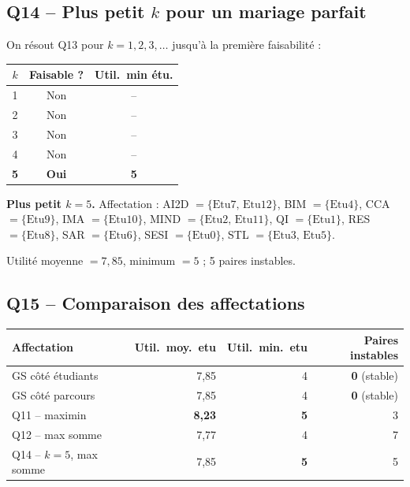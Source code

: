 \documentclass[11pt,a4paper]{article}
\begin{document}
\subsection*{Q14 -- Plus petit $k$ pour un mariage parfait}

On résout Q13 pour $k = 1, 2, 3, \ldots$ jusqu'à la première faisabilité :

\begin{center}
\begin{tabular}{ccc}
\toprule
$k$ & \textbf{Faisable ?} & \textbf{Util.\ min étu.} \\
\midrule
1 & Non & -- \\
2 & Non & -- \\
3 & Non & -- \\
4 & Non & -- \\
\textbf{5} & \textbf{Oui} & \textbf{5} \\
\bottomrule
\end{tabular}
\end{center}

\textbf{Plus petit $k = 5$.} Affectation : AI2D $= \{\text{Etu7, Etu12}\}$, BIM $= \{\text{Etu4}\}$, CCA $= \{\text{Etu9}\}$, IMA $= \{\text{Etu10}\}$, MIND $= \{\text{Etu2, Etu11}\}$, QI $= \{\text{Etu1}\}$, RES $= \{\text{Etu8}\}$, SAR $= \{\text{Etu6}\}$, SESI $= \{\text{Etu0}\}$, STL $= \{\text{Etu3, Etu5}\}$.

Utilité moyenne $= 7{,}85$, minimum $= 5$ ; 5 paires instables.

\subsection*{Q15 -- Comparaison des affectations}

\begin{center}
\begin{tabular}{lrrr}
\toprule
\textbf{Affectation} & \textbf{Util.\ moy.\ etu} & \textbf{Util.\ min.\ etu} & \textbf{Paires instables} \\
\midrule
GS côté étudiants & 7,85 & 4 & \textbf{0} (stable) \\
GS côté parcours  & 7,85 & 4 & \textbf{0} (stable) \\
Q11 -- maximin    & \textbf{8,23} & \textbf{5} & 3 \\
Q12 -- max somme  & 7,77 & 4 & 7 \\
Q14 -- $k=5$, max somme & 7,85 & \textbf{5} & 5 \\
\bottomrule
\end{tabular}
\end{center}
\end{document}
